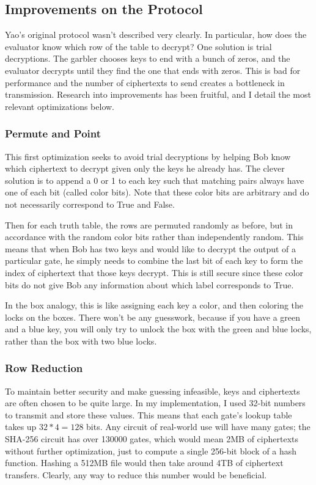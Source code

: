 \subsection{Improvements on the Protocol}
Yao's original protocol wasn't described very clearly. In particular, how does the evaluator know which row of the table to decrypt? One solution is trial decryptions. The garbler chooses keys to end with a bunch of zeros, and the evaluator decrypts until they find the one that ends with zeros. This is bad for performance and the number of ciphertexts to send creates a bottleneck in transmission. Research into improvements has been fruitful, and I detail the most relevant optimizations below.

\subsubsection{Permute and Point}
This first optimization seeks to avoid trial decryptions by helping Bob know which ciphertext to decrypt given only the keys he already has. The clever solution is to append a 0 or 1 to each key such that matching pairs always have one of each bit (called color bits)\cite{gentle}. Note that these color bits are arbitrary and do not necessarily correspond to True and False.

Then for each truth table, the rows are permuted randomly as before, but in accordance with the random color bits rather than independently random\cite{gentle}. This means that when Bob has two keys and would like to decrypt the output of a particular gate, he simply needs to combine the last bit of each key to form the index of ciphertext that those keys decrypt. This is still secure since these color bits do not give Bob any information about which label corresponds to True\cite{Fairplay}.

In the box analogy, this is like assigning each key a color, and then coloring the locks on the boxes. There won't be any guesswork, because if you have a green and a blue key, you will only try to unlock the box with the green and blue locks, rather than the box with two blue locks.

\subsubsection{Row Reduction}
To maintain better security and make guessing infeasible, keys and ciphertexts are often chosen to be quite large. In my implementation, I used 32-bit numbers to transmit and store these values. This means that each gate's lookup table takes up $32*4=128$ bits. Any circuit of real-world use will have many gates; the SHA-256 circuit has over 130000 gates\cite{bristol}, which would mean 2MB of ciphertexts without further optimization, just to compute a single 256-bit block of a hash function. Hashing a 512MB file would then take around 4TB of ciphertext transfers. Clearly, any way to reduce this number would be beneficial.

